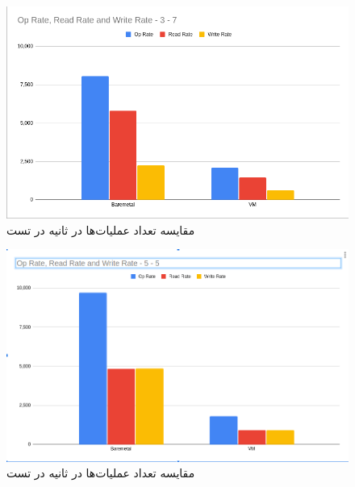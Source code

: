 \subsection{}
\begin{figure}[H]
    \centering
    \includegraphics[scale=0.5]{pictures/cassandra/overall_result-3-7.png}
    \caption{ مقایسه تعداد عملیات‌ها در ثانیه در تست }
    \label{fig:cassandra:init:overall_results1}
\end{figure}
\begin{figure}[H]
    \centering
    \includegraphics[scale=0.45]{pictures/cassandra/overall_result-5-5.png}
    \caption{ مقایسه تعداد عملیات‌ها در ثانیه در تست }
    \label{fig:cassandra:init:overall_results1}
\end{figure}
